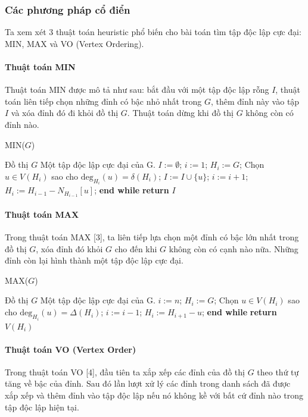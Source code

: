 \documentclass[14pt, oneside, a4paper, openany]{scrartcl}
\begin{document}
\subsubsection{Các phương pháp cổ điển}
Ta xem xét 3 thuật toán heuristic phổ biến cho bài toán tìm tập độc lập cực đại: MIN, MAX và VO (Vertex Ordering).

\paragraph{Thuật toán MIN}
Thuật toán MIN  được mô tả như sau: bắt đầu với một tập độc lập rỗng $I$, thuật toán liên tiếp chọn những đỉnh có bậc nhỏ nhất trong $G$, thêm đỉnh này vào tập $I$ và xóa đỉnh đó đi khỏi đồ thị $G$. Thuật toán dừng khi đồ thị $G$ không còn có đỉnh nào.

\begin{algorithm}
	\caption{MIN($G$)}\label{MIN}
	\begin{algorithmic}[1]
		\INPUT Đồ thị $G$
		\OUTPUT Một tập độc lập cực đại của G.
		\State $I:= \emptyset$; $i:=1$; $H_i := G$;
			\State Chọn $u \in V(H_i)$ sao cho $\textrm{deg}_{H_i}(u) = \delta(H_i)$;
			\State $I := I \cup \{u\}$; $i:=i+1$; $H_i := H_{i-1} - N_{H_{i-1}}[u]$;
		\EndWhile
		\State \textbf{end while}
		\State \textbf{return} $I$
	\end{algorithmic}
\end{algorithm}
\paragraph{Thuật toán MAX}
Trong thuật toán MAX  [3], ta liên tiếp lựa chọn một đỉnh có bậc lớn nhất trong đồ thị $G$, xóa đỉnh đó khỏi $G$ cho đến khi $G$ không còn có cạnh nào nữa. Những đỉnh còn lại hình thành một tập độc lập cực đại.

\begin{algorithm}
	\caption{MAX($G$)}\label{MAX}
	\begin{algorithmic}[1]
		\INPUT Đồ thị $G$
		\OUTPUT Một tập độc lập cực đại của G.
		\State $i:=n$; $H_i := G$;
			\State Chọn $u \in V(H_i)$ sao cho $\textrm{deg}_{H_i}(u) = \Delta(H_i)$;
			\State $i:=i - 1$; $H_i := H_{i+1} - u$;
		\EndWhile
		\State \textbf{end while}
		\State \textbf{return} $V(H_i)$
	\end{algorithmic}
\end{algorithm}
\paragraph{Thuật toán VO (Vertex Order)}
Trong thuật toán VO  [4], đầu tiên ta xắp xếp các đỉnh của đồ thị $G$ theo thứ tự tăng về bậc của đỉnh. Sau đó lần lượt xử lý các đỉnh trong danh sách đã được xắp xếp và thêm đỉnh vào tập độc lập nếu nó không kề với bất cứ đỉnh nào trong tập độc lập hiện tại.
\end{document}
